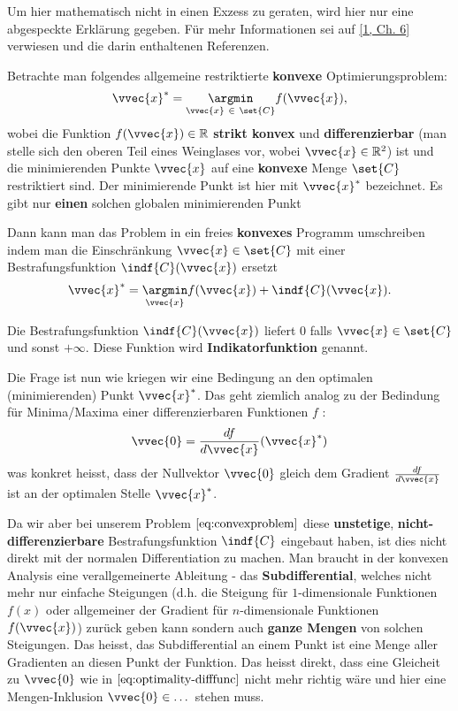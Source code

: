 \documentclass[
  12pt,
  british,
  paper=a4,
  twoside,
  titlepage=true,
  openright,
  abstract=on,
  toc=listofnumbered,
  numbers=noenddot,
  chapterprefix=true,
  headings=optiontohead,
  svgnames,
  dvipsnames]{scrreprt}
\begin{document}
Um hier mathematisch nicht in einen Exzess zu geraten, wird hier nur
eine abgespeckte Erklärung gegeben. Für mehr Informationen sei auf
\protect\hyperlink{ref-nuetzig_thesis_2016}{{[}1, Ch. 6{]}} verwiesen
und die darin enthaltenen Referenzen.

Betrachte man folgendes allgemeine restriktierte \textbf{konvexe}
Optimierungsproblem:
\begin{align} \vvec{x}^* = \underset{\vvec{x} \ \in \ \set{C}}{\argmin} f(\vvec{x}), \label{eq:convexproblem} \end{align}
wobei die Funktion \(f(\vvec{x}) \in \mathbb{R}\) \textbf{strikt konvex}
und \textbf{differenzierbar} (man stelle sich den oberen Teil eines
Weinglases vor, wobei \(\vvec{x} \in \mathbb{R}^2\)) ist und die
minimierenden Punkte \(\vvec{x}\) auf eine \textbf{konvexe} Menge
\(\set{C}\) restriktiert sind. Der minimierende Punkt ist hier mit
\(\vvec{x}^*\) bezeichnet. Es gibt nur \textbf{einen} solchen globalen
minimierenden Punkt

Dann kann man das Problem in ein freies \textbf{konvexes} Programm
umschreiben indem man die Einschränkung \(\vvec{x} \in \set{C}\) mit
einer Bestrafungsfunktion \(\indf{C}(\vvec{x})\) ersetzt
\begin{align} \vvec{x}^* = \underset{\vvec{x}}{\argmin} f(\vvec{x}) + \indf{C}(\vvec{x}). \end{align}

Die Bestrafungsfunktion \(\indf{C}(\vvec{x})\) liefert \(0\) falls
\(\vvec{x} \in \set{C}\) und sonst \(+\infty\). Diese Funktion wird
\textbf{Indikatorfunktion} genannt.

Die Frage ist nun wie kriegen wir eine Bedingung an den optimalen
(minimierenden) Punkt \(\vvec{x}^*\). Das geht ziemlich analog zu der
Bedindung für Minima/Maxima einer differenzierbaren Funktionen \(f\) :
\begin{align} \vvec{0} = \frac{df}{d\vvec{x}}(\vvec{x}^*) \label{eq:optimality-difffunc} \end{align}
was konkret heisst, dass der Nullvektor \(\vvec{0}\) gleich dem Gradient
\(\frac{df}{d\vvec{x}}\) ist an der optimalen Stelle \(\vvec{x}^*\).

Da wir aber bei unserem Problem \(\eqref{eq:convexproblem}\) diese
\textbf{unstetige}, \textbf{nicht-differenzierbare} Bestrafungsfunktion
\(\indf{C}\) eingebaut haben, ist dies nicht direkt mit der normalen
Differentiation zu machen. Man braucht in der konvexen Analysis eine
verallgemeinerte Ableitung - das \textbf{Subdifferential}, welches nicht
mehr nur einfache Steigungen (d.h. die Steigung für \(1\)-dimensionale
Funktionen \(f(x)\) oder allgemeiner der Gradient für \(n\)-dimensionale
Funktionen \(f(\vvec{x})\)) zurück geben kann sondern auch \textbf{ganze
Mengen} von solchen Steigungen. Das heisst, das Subdifferential an einem
Punkt ist eine Menge aller Gradienten an diesen Punkt der Funktion. Das
heisst direkt, dass eine Gleicheit zu \(\vvec{0}\) wie in
\(\eqref{eq:optimality-difffunc}\) nicht mehr richtig wäre und hier eine
Mengen-Inklusion \(\vvec{0} \in \dots\) stehen muss.
\end{document}
